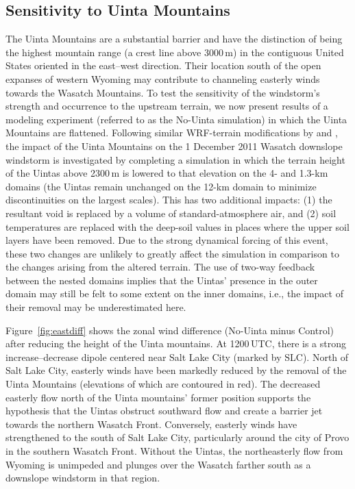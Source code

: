 \documentclass[pdftex,12pt]{article}
\begin{document}
\subsection{Sensitivity to Uinta Mountains}
The Uinta Mountains are a substantial barrier and have the distinction of being the highest mountain range (a crest line above 3000\,m) in the contiguous United States oriented in the east--west direction. Their location south of the open expanses of western Wyoming may contribute to channeling easterly winds towards the Wasatch Mountains. To test the sensitivity of the windstorm's strength and occurrence to the upstream terrain, we now present results of a modeling experiment (referred to as the No-Uinta simulation) in which the Uinta Mountains are flattened. Following similar WRF-terrain modifications by \citet{West2011} and \citet{Alcott2013}, the impact of the Uinta Mountains on the 1 December 2011 Wasatch downslope windstorm is investigated by completing a simulation in which the terrain height of the Uintas above 2300\,m is lowered to that elevation on the 4- and 1.3-km domains (the Uintas remain unchanged on the 12-km domain to minimize discontinuities on the largest scales). This has two additional impacts: (1) the resultant void is replaced by a volume of standard-atmosphere air, and (2) soil temperatures are replaced with the deep-soil values in places where the upper soil layers have been removed. Due to the strong dynamical forcing of this event, these two changes are unlikely to greatly affect the simulation in comparison to the changes arising from the altered terrain. The use of two-way feedback between the nested domains implies that the Uintas' presence in the outer domain may still be felt to some extent on the inner domains, i.e., the impact of their removal may be underestimated here.  

Figure~\ref{fig:eastdiff} shows the zonal wind difference (No-Uinta minus Control) after reducing the height of the Uinta mountains. At 1200\,UTC, there is a strong increase--decrease dipole centered near Salt Lake City (marked by SLC). North of Salt Lake City, easterly winds have been markedly reduced by the removal of the Uinta Mountains (elevations of which are contoured in red). The decreased easterly flow north of the Uinta mountains' former position supports the hypothesis that the Uintas obstruct southward flow and create a barrier jet towards the northern Wasatch Front. Conversely, easterly winds have strengthened to the south of Salt Lake City, particularly around the city of Provo in the southern Wasatch Front. Without the Uintas, the northeasterly flow from Wyoming is unimpeded and plunges over the Wasatch farther south as a downslope windstorm in that region.
\end{document}

